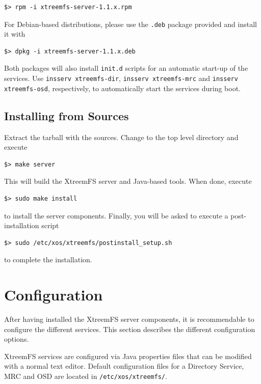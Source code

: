 \documentclass[a4paper,10pt]{book}
\begin{document}
\begin{verbatim}
$> rpm -i xtreemfs-server-1.1.x.rpm
\end{verbatim}


For Debian-based distributions, please use the \texttt{.deb} package provided and install it with


\begin{verbatim}
$> dpkg -i xtreemfs-server-1.1.x.deb
\end{verbatim}


Both packages will also install \texttt{init.d} scripts for an automatic start-up of the services. Use \texttt{insserv xtreemfs-dir}, \texttt{insserv xtreemfs-mrc} and \texttt{insserv xtreemfs-osd}, respectively, to automatically start the services during boot.

\subsection{Installing from Sources}

Extract the tarball with the sources. Change to the top level directory and execute

\begin{verbatim}
$> make server
\end{verbatim}

This will build the XtreemFS server and Java-based tools. When done, execute

\begin{verbatim}
$> sudo make install
\end{verbatim}

to install the server components. Finally, you will be asked to execute a post-installation script

\begin{verbatim}
$> sudo /etc/xos/xtreemfs/postinstall_setup.sh
\end{verbatim}

to complete the installation.

\section{Configuration}
\label{sec:service_config}

After having installed the XtreemFS server components, it is recommendable to configure the different services. This section describes the different configuration options.

XtreemFS services are configured via Java properties files that can be modified with a normal text editor. Default configuration files for a Directory Service, MRC and OSD are located in \texttt{/etc/xos/xtreemfs/}.
\end{document}
